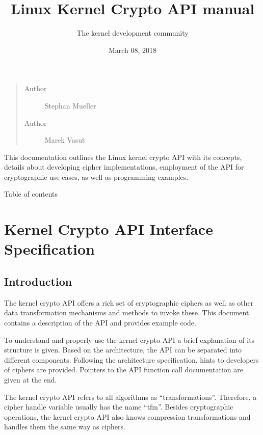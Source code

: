 \documentclass[a4paper,8pt,english]{sphinxmanual}
\title{Linux Kernel Crypto API manual}
\date{March 08, 2018}
\author{The kernel development community}
\begin{document}
\maketitle
\tableofcontents
{}\label{crypto/index::doc}

\begin{quote}\begin{description}
\item[{Author}] \leavevmode
Stephan Mueller

\item[{Author}] \leavevmode
Marek Vasut

\end{description}\end{quote}

This documentation outlines the Linux kernel crypto API with its
concepts, details about developing cipher implementations, employment of the API
for cryptographic use cases, as well as programming examples.

Table of contents


\chapter{Kernel Crypto API Interface Specification}
\label{crypto/intro:linux-kernel-crypto-api}\label{crypto/intro::doc}\label{crypto/intro:kernel-crypto-api-interface-specification}

\section{Introduction}
\label{crypto/intro:introduction}
The kernel crypto API offers a rich set of cryptographic ciphers as well
as other data transformation mechanisms and methods to invoke these.
This document contains a description of the API and provides example
code.

To understand and properly use the kernel crypto API a brief explanation
of its structure is given. Based on the architecture, the API can be
separated into different components. Following the architecture
specification, hints to developers of ciphers are provided. Pointers to
the API function call documentation are given at the end.

The kernel crypto API refers to all algorithms as ``transformations''.
Therefore, a cipher handle variable usually has the name ``tfm''. Besides
cryptographic operations, the kernel crypto API also knows compression
transformations and handles them the same way as ciphers.
\end{document}
